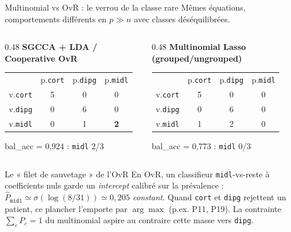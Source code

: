 \documentclass[aspectratio=169, 10pt]{beamer}
\begin{document}
\begin{frame}{Multinomial vs OvR : le verrou de la classe rare}
  \vspace{15pt}
  Mêmes équations, comportements différents en $p \gg n$ avec classes déséquilibrées.

  \medskip
  \begin{columns}[c]
    \begin{column}{0.48\textwidth}
      \centering
      \textbf{SGCCA + LDA / Cooperative OvR}
      \vskip 2pt
      \small
      \setlength{\tabcolsep}{7pt}
      \begin{tabular}{lccc}
                        & p.\texttt{cort}          & p.\texttt{dipg}          & p.\texttt{midl}                 \\
        v.\texttt{cort} & \cellcolor{lightgeblue}5 & 0                        & 0                               \\
        v.\texttt{dipg} & 0                        & \cellcolor{lightgeblue}6 & 0                               \\
        v.\texttt{midl} & 0                        & 1                        & \cellcolor{cellgreen}\textbf{2} \\
      \end{tabular}
      \vskip 2pt
      bal\_acc = 0,924 : \texttt{midl} 2/3
    \end{column}

    \begin{column}{0.48\textwidth}
      \centering
      \textbf{Multinomial Lasso (grouped/ungrouped)}
      \vskip 2pt
      \small
      \setlength{\tabcolsep}{7pt}
      \begin{tabular}{lccc}
                        & p.\texttt{cort}          & p.\texttt{dipg}          & p.\texttt{midl}           \\
        v.\texttt{cort} & \cellcolor{lightgeblue}5 & 0                        & 0                         \\
        v.\texttt{dipg} & 0                        & \cellcolor{lightgeblue}6 & 0                         \\
        v.\texttt{midl} & 1                        & \cellcolor{cellred}2     & \cellcolor{celllightred}0 \\
      \end{tabular}
      \vskip 2pt
      bal\_acc = 0,773 : \texttt{midl} 0/3
    \end{column}
  \end{columns}

  \medskip
  \begin{exampleblock}{Le « filet de sauvetage » de l’OvR}
    En OvR, un classifieur \texttt{midl}-vs-reste à coefficients nuls garde un \textit{intercept} calibré sur la prévalence :
    $\hat{P}_{\texttt{midl}} \simeq \sigma(\log(8/31)) \simeq 0{,}205$ \textit{constant}.
    Quand \texttt{cort} et \texttt{dipg} rejettent un patient, ce plancher l’emporte par $\arg\max$ (p.ex. P11, P19). La contrainte $\sum_c P_c = 1$ du multinomial aspire au contraire cette masse vers \texttt{dipg}.
  \end{exampleblock}
\end{frame}
\end{document}
